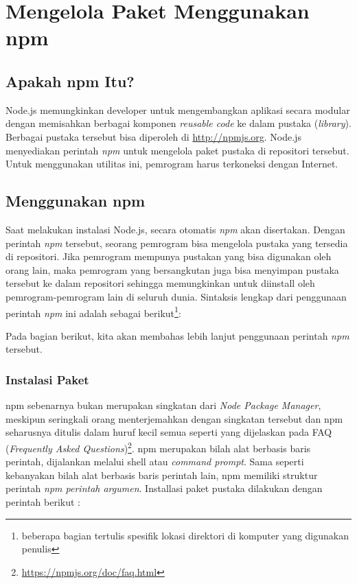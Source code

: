 \chapter{Mengelola Paket Menggunakan npm}

\section{Apakah npm Itu?}

Node.js memungkinkan developer untuk mengembangkan aplikasi secara modular dengan memisahkan berbagai komponen \textit{reusable code} ke dalam pustaka (\textit{library}). Berbagai pustaka tersebut bisa diperoleh di \url{http://npmjs.org}. Node.js menyediakan perintah \textit{npm} untuk mengelola paket pustaka di repositori tersebut. Untuk menggunakan utilitas ini, pemrogram harus terkoneksi dengan Internet.

\section{Menggunakan npm}

Saat melakukan instalasi Node.js, secara otomatis \textit{npm} akan disertakan. Dengan perintah \textit{npm} tersebut, seorang pemrogram bisa mengelola pustaka yang tersedia di repositori. Jika pemrogram mempunya pustakan yang bisa digunakan oleh orang lain, maka pemrogram yang bersangkutan juga bisa menyimpan pustaka tersebut ke dalam repositori sehingga memungkinkan untuk diinstall oleh pemrogram-pemrogram lain di seluruh dunia. Sintaksis lengkap dari penggunaan perintah \textit{npm} ini adalah sebagai berikut\footnote{beberapa bagian tertulis spesifik lokasi direktori di komputer yang digunakan penulis}:



Pada bagian berikut, kita akan membahas lebih lanjut penggunaan perintah \textit{npm} tersebut.

\subsection{Instalasi Paket}

npm sebenarnya bukan merupakan singkatan dari \textit{Node Package Manager}, meskipun seringkali orang menterjemahkan dengan singkatan tersebut dan npm seharusnya ditulis dalam huruf kecil semua seperti yang dijelaskan pada FAQ (\textit{Frequently Asked Questions})\footnote{\url{https://npmjs.org/doc/faq.html}}. npm merupakan bilah alat berbasis baris perintah, dijalankan melalui shell atau \textit{command prompt}. Sama seperti kebanyakan bilah alat berbasis baris perintah lain, npm memiliki struktur perintah \textit{npm perintah argumen}. Installasi paket pustaka dilakukan dengan perintah berikut :

